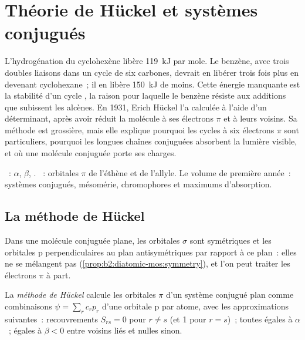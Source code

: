 \chapter{Théorie de Hückel et systèmes conjugués}\label{ch:b2:huckel}

L'hydrogénation du cyclohexène libère \qty{119}{kJ} par mole. Le benzène,
avec trois doubles liaisons dans un cycle de six carbones, devrait en libérer trois fois
plus en devenant cyclohexane~; il en libère \qty{150}{kJ} de moins. Cette énergie
manquante est la stabilité d'un cycle , la raison pour laquelle le benzène résiste
aux additions que subissent les alcènes. En 1931, Erich Hückel l'a calculée à l'aide d'un
déterminant, après avoir réduit la molécule à ses électrons $\pi$ et à leurs
voisins. Sa méthode est grossière, mais elle explique pourquoi les cycles à six électrons $\pi$
sont particuliers, pourquoi les longues chaînes conjuguées absorbent la lumière visible, et
où une molécule conjuguée porte ses charges.

\begin{recall}
~:  $\alpha$,  $\beta$,
. ~: orbitales $\pi$ de l'éthène et
de l'allyle. Le volume de première année~: systèmes conjugués, mésomérie, chromophores et
maximums d'absorption.
\end{recall}

\section{La méthode de Hückel}

Dans une molécule conjuguée plane, les orbitales $\sigma$ sont symétriques et les orbitales p
perpendiculaires au plan antisymétriques par rapport à ce plan~: elles
ne se mélangent pas (\cref{prop:b2:diatomic-mos:symmetry}), et l'on peut traiter les
électrons $\pi$ à part.

\begin{definition}\label{def:b2:huckel:method}
La \emph{méthode de Hückel} calcule les orbitales $\pi$ d'un
système conjugué plan comme combinaisons $\psi = \sum_r c_r p_r$ d'une orbitale p par
atome, avec les approximations suivantes~: recouvrements $S_{rs} = 0$ pour $r \neq s$ (et 1 pour $r =
s$)~;  toutes égales à $\alpha$~;  égales à $\beta < 0$
entre voisins liés et nulles sinon.
\end{definition}

